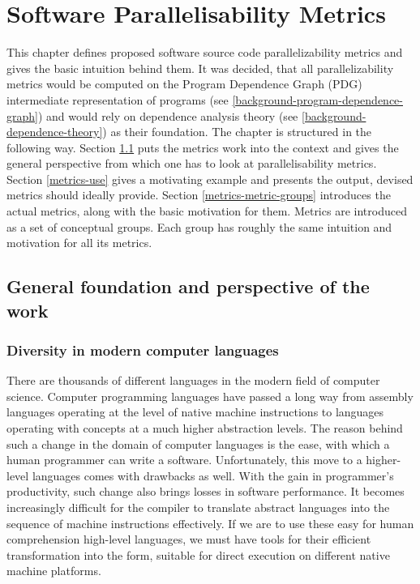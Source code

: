 \chapter{Software Parallelisability Metrics}
\label{metrics}
\qquad This chapter defines proposed software source code parallelizability metrics and gives the basic intuition behind them. It was decided, that all parallelizability metrics would be computed on the Program Dependence Graph (PDG) intermediate representation of programs (see \ref{background-program-dependence-graph}) and would rely on dependence analysis theory (see \ref{background-dependence-theory}) as their foundation.\newline
\null\qquad The chapter is structured in the following way. Section \ref{metrics-foundation-and-perspective} puts the metrics work into the context and gives the general perspective from which one has to look at parallelisability metrics. Section \ref{metrics-use} gives a motivating example and presents the output, devised metrics should ideally provide. Section \ref{metrics-metric-groups} introduces the actual metrics, along with the basic motivation for them. Metrics are introduced as a set of conceptual groups. Each group has roughly the same intuition and motivation for all its metrics.

\section{General foundation and perspective of the work} \label{metrics-foundation-and-perspective}

\subsection{Diversity in modern computer languages}
\label{metrics-diversity-in-modern-computer-languages}
\qquad There are thousands of different languages in the modern field of computer science. Computer programming languages have passed a long way from assembly languages operating at the level of native machine instructions to languages operating with concepts at a much higher abstraction levels. The reason behind such a change in the domain of computer languages is the ease, with which a human programmer can write a software.\newline
\null\qquad Unfortunately, this move to a higher-level languages comes with drawbacks as well. With the gain in programmer's productivity, such change also brings losses in software performance. It becomes increasingly difficult for the compiler to translate abstract languages into the sequence of machine instructions effectively.\newline
\null\qquad If we are to use these easy for human comprehension high-level languages, we must have tools for their efficient transformation into the form, suitable for direct execution on different native machine platforms.

